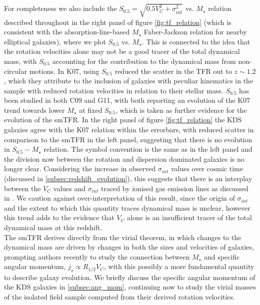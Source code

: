 \documentclass[fleqn,usenatbib]{mn2e}
\begin{document}
For completeness we also include the $S_{0.5} = \sqrt{0.5V_{C}^{2} + \sigma_{int}^{2}}$ vs. $M_{\star}$ relation described throughout \cite[K07][]{Kassin2007} in the right panel of figure \ref{fig:tf_relation} (which is consistent with the absorption-line-based $M_{\star}$ Faber-Jackson relation for nearby elliptical galaxies), where we plot $S_{0.5}$ vs. $M_{\star}$. 
This is connected to the idea that the rotation velocities alone may not be a good tracer of the total dynamical mass, with $S_{0.5}$ accounting for the contribution to the dynamical mass from non-circular motions.
In K07, using $S_{0.5}$ reduced the scatter in the TFR out to $z\sim1.2$, which they attribute to the inclusion of galaxies with peculiar kinematics in the sample with reduced rotation velocities in relation to their stellar mass.
$S_{0.5}$ has been studied in both C09 and G11, with both reporting an evolution of the K07 trend towards lower $M_{\star}$ at fixed $S_{0.5}$, which is taken as further evidence for the evolution of the smTFR.
In the right panel of figure \ref{fig:tf_relation} the KDS galaxies agree with the K07 relation within the errorbars, with reduced scatter in comparison to the smTFR in the left panel, suggesting that there is no evolution in $S_{0.5}-M_{\star}$ relation.
The symbol convention is the same as in the left panel and the division now between the rotation and dispersion dominated galaxies is no longer clear. 
Considering the increase in observed $\sigma_{int}$ values over cosmic time (discussed in \cref{subsec:redshift_evolution}), this suggests that there is an interplay between the $V_{C}$ values and $\sigma_{int}$ traced by ionised gas emission lines as discussed in \cite{Kassin2012}. 
We caution against over-interpretation of this result, since the origin of $\sigma_{int}$ and the extent to which this quantity traces dynamical mass is unclear, however this trend adds to the evidence that $V_{C}$ alone is an insufficient tracer of the total dynamical mass at this redshift. \\

The smTFR derives directly from the virial theorem, in which changes to the dynamical mass are driven by changes in both the sizes and velocities of galaxies, prompting authors recently \citep[e.g.][]{Cortese2016,Contini2015a,Burkert2016a,Harrison2017,Swinbank2017} to study the connection between $M_{\star}$ and specific angular momentum, $j_{s} \propto R_{1/2}V_{C}$, with this possibly a more fundamental quantity to describe galaxy evolution.
We briefly discuss the specific angular momentum of the KDS galaxies in \cref{subsec:ang_mom}, continuing now to study the virial masses of the isolated field sample computed from their derived rotation velocities.
\end{document}
